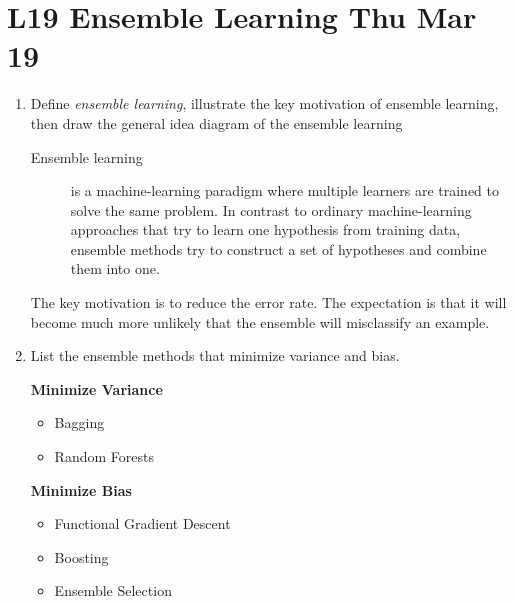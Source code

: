 \documentclass[12pt]{article}
\newenvironment{QandA}{\begin{enumerate}[label=\bfseries\arabic*.]\bfseries}
{\end{enumerate}}
\newenvironment{answered}{\par\normalfont\color{Sepia}}{}
\begin{document}
\section*{L19 Ensemble Learning \textemdash{} Thu Mar 19}
\begin{QandA}
    \item Define  \textit{ensemble learning}, illustrate the key motivation of ensemble learning, then draw the general idea diagram of the ensemble learning
    \begin{answered}
        \begin{description}
            \item[Ensemble learning] is a machine-learning paradigm where multiple learners are 
            trained to solve the same problem. In contrast to ordinary machine-learning approaches 
            that try to learn one hypothesis from training data, ensemble methods try to construct 
            a set of hypotheses and combine them into one.
        \end{description}
        The key motivation is to reduce the error rate. The expectation is that it will become much more unlikely 
        that the ensemble will misclassify an example.
    \end{answered}

    \item List the ensemble methods that minimize variance and bias.
    \begin{answered}
        \textbf{Minimize Variance}
        \begin{itemize}
            \item Bagging
            \item Random Forests
        \end{itemize}

        \textbf{Minimize Bias}
        \begin{itemize}
            \item Functional Gradient Descent
            \item Boosting
            \item Ensemble Selection
        \end{itemize}
    \end{answered}


\end{QandA}
\end{document}
